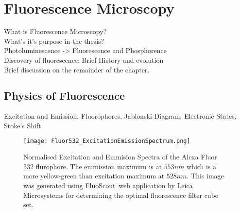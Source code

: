 
\chapter{Fluorescence Microscopy} %

\label{chap:Chapter2} %

\citep{Nobel2016}
\citep{AbramowitzDavidson2016}
\citep{Biehlmaier2013}
\citep{Svoboda2007}
\citep{Svoboda2009}
\citep{WuMerchantCastleman2008}
\citep{GonzalezWoods2002}
\citep{Pratt2001}
\citep{Soile2004}
\citep{Matula2006}
\citep{Rohr2010}
\citep{Matula2000}
\citep{Vu2008}
\citep{Kolmogorov2004}
\citep{Kozubek2001}
\citep{Petran1985}


What is Fluorescence Microscopy?\\
What's it's purpose in the thesis?\\
Photoluminescence -> Fluorescence and Phosphorence\\
Discovery of fluorescence: Brief History and evolution\\
Brief discussion on the remainder of the chapter.


\section{Physics of Fluorescence}
\label{sec:PhysicsOfFluorescence}

Excitation and Emission, Fluorophores, Jablonski Diagram, Electronic States, Stoke's Shift
\begin{figure}[!h]
	\centering
	\texttt{[image: Fluor532\_ExcitationEmissionSpectrum.png]}
	\caption{Normalised Excitation and Emmision Spectra of the Alexa Fluor 532 flurophore. The emmission maximum is at $553nm$ which is a more yellow-green than excitation maximum at $528nm$. This image was generated using FluoScout\texttrademark\, web application by Leica Microsystems for determining the optimal fluorescence filter cube set. %
	}
	\label{fig:excitationandemissionspectra}
\end{figure}

